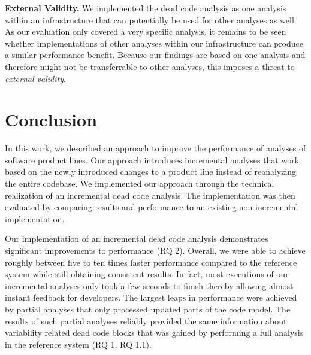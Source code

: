 \documentclass[a4paper]{article}
\begin{document}
\textbf{External Validity.} We implemented the dead code analysis as one analysis within an infrastructure that can potentially be used for other analyses as well. As our evaluation only covered a very specific analysis, it remains to be seen whether implementations of other analyses within our infrastructure can produce a similar performance benefit. Because our findings are based on one analysis and therefore might not be transferrable to other analyses, this imposes a threat to \emph{external validity}.


\clearpage
\newpage
\section{Conclusion}\label{conclusion}

In this work, we described an approach to improve the performance of analyses of software product lines. Our approach introduces incremental analyses that work based on the newly introduced changes to a product line instead of reanalyzing the entire codebase. We implemented our approach through the technical realization of an incremental dead code analysis. The implementation was then evaluated by comparing results and performance to an existing non-incremental implementation.

Our implementation of an incremental dead code analysis demonstrates significant improvements to performance (RQ 2). Overall, we were able to achieve roughly between five to ten times faster performance compared to the reference system while still obtaining consistent results. 
In fact, most executions of our incremental analyses only took a few seconds to finish thereby allowing   almost instant feedback for developers. The largest leaps in performance were achieved by partial analyses that only processed updated parts of the code model. The results of such partial analyses reliably provided the same information about variability related dead code blocks that was gained by performing a full analysis in the reference system (RQ 1, RQ 1.1). 
\end{document}
